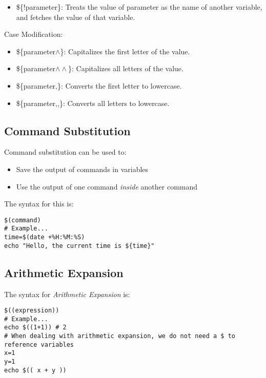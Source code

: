 \documentclass{report}
\begin{document}
    \begin{itemize}
        \item \$\{!parameter\}: Treats the value of parameter as the name of another variable, and fetches the value of that variable.
    \end{itemize}
    \bigbreak \noindent 
    Case Modification:
    \begin{itemize}
        \item \$\{parameter$\land$\}: Capitalizes the first letter of the value.
        \item \$\{parameter$\land\land$\}: Capitalizes all letters of the value.
        \item \$\{parameter,\}: Converts the first letter to lowercase.
        \item \$\{parameter,,\}: Converts all letters to lowercase.
    \end{itemize}

    \pagebreak \bigbreak \noindent 
    \subsection{Command Substitution}
    \bigbreak \noindent 
    \begin{concept}
		 Command substitution can be used to:
	\end{concept}
    \begin{itemize}
        \item Save the output of commands in variables
        \item Use the output of one command \textit{inside} another command
    \end{itemize}
    \bigbreak \noindent 
    The syntax for this is:
    \begin{mdframed}[style=purplebox]
    \begin{verbatim}
$(command)
# Example...
time=$(date +%H:%M:%S)
echo "Hello, the current time is ${time}"
    \end{verbatim}
    \bigbreak \noindent
    \end{mdframed}

    \bigbreak \noindent 
    \subsection{Arithmetic Expansion}
    \bigbreak \noindent 
    The syntax for \textit{Arithmetic Expansion} is:
    \begin{mdframed}[style=purplebox]
    \begin{verbatim}
$((expression))
# Example...
echo $((1+1)) # 2
# When dealing with arithmetic expansion, we do not need a $ to reference variables
x=1
y=1
echo $(( x + y ))
    \end{verbatim}
    \bigbreak \noindent
    \end{mdframed}
    
\end{document}

